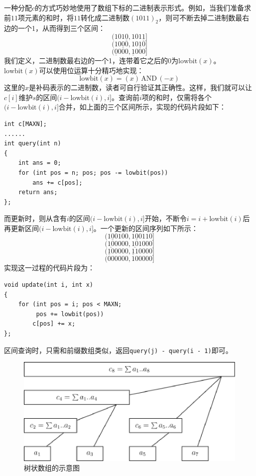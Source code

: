 \documentclass{cjc}
\begin{document}
一种分配$c$的方式巧妙地使用了数组下标的二进制表示形式。例如，当我们准备求前$11$项元素的和时，将$11$转化成二进制数$(1011)_2$，则可不断去掉二进制数最右边的一个1，从而得到三个区间：
\begin{equation*}
  (101\underline{0},101\underline{1}]
\end{equation*}
\begin{equation*}
  (10\underline{0}0,10\underline{1}0]
\end{equation*}
\begin{equation*}
  (\underline{0}000,\underline{1}000]
\end{equation*}
我们定义，二进制数最右边的一个1，连带着它之后的0为$\text{lowbit}(x)$。$\text{lowbit}(x)$可以使用位运算十分精巧地实现：
\begin{equation*}
  \text{lowbit}(x) = (x)\, \text{AND}\, (-x)
\end{equation*}
这里的$x$是补码表示的二进制数，读者可自行验证其正确性。这样，我们就可以让$c[i]$维护$s$的区间$(i-\text{lowbit}(i),i]$。查询前$i$项的和时，仅需将各个$(i-\text{lowbit}(i),i]$合并，如上面的三个区间所示，实现的代码片段如下：
\begin{lstlisting}
int c[MAXN];
......
int query(int n)
{
    int ans = 0;
    for (int pos = n; pos; pos -= lowbit(pos))
        ans += c[pos];
    return ans;
};
\end{lstlisting}
而更新时，则从含有$i$的区间$(i-\text{lowbit}(i),i]$开始，不断令$i=i+\text{lowbit}(i)$后再更新区间$(i-\text{lowbit}(i),i]$。一个更新的区间序列如下所示：
\begin{equation*}
  (\underline{100}100,\underline{100}110]
\end{equation*}
\begin{equation*}
  (\underline{10}0000,\underline{10}1000]
\end{equation*}
\begin{equation*}
  (\underline{1}00000,\underline{1}10000]
\end{equation*}
\begin{equation*}
  (000000,100000]
\end{equation*}
实现这一过程的代码片段为：
\begin{lstlisting}
void update(int i, int x)
{
    for (int pos = i; pos < MAXN; 
         pos += lowbit(pos))
        c[pos] += x;
};
\end{lstlisting}
区间查询时，只需和前缀数组类似，返回\lstinline{query(j) - query(i - 1)}即可。
\begin{figure}[htb]
  \centering
  \includegraphics[width=\linewidth]{images/fenwick.eps}
  \caption{树状数组的示意图}
\end{figure}
\end{document}
